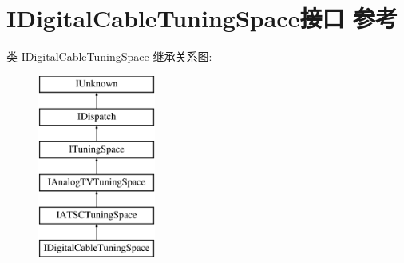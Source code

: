 \hypertarget{interface_i_digital_cable_tuning_space}{}\section{I\+Digital\+Cable\+Tuning\+Space接口 参考}
\label{interface_i_digital_cable_tuning_space}
类 I\+Digital\+Cable\+Tuning\+Space 继承关系图\+:\begin{figure}[H]
\begin{center}
\leavevmode
\includegraphics[height=6.000000cm]{interface_i_digital_cable_tuning_space}
\end{center}
\end{figure}
